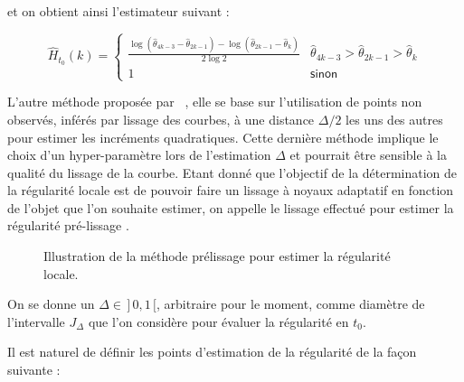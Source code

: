 et on obtient ainsi l'estimateur suivant :

$$\hat H_{t_0}(k) = \begin{cases} \displaystyle\frac{\log\left( \hat \theta_{4k-3} - \hat \theta_{2k-1}  \right) - \log \left(  \hat\theta_{2k-1} - \hat \theta_k \right)}{2\log 2} & \hat \theta_{4k-3} > \hat \theta_{2k-1} > \hat \theta_{k}
    \\
    1 & \textsf{sinon}
\end{cases}$$


L'autre méthode proposée par ~\cite{golovkine2021adaptive,maissoro-SmoothnessFTSweakDep}, elle se base sur l'utilisation de points non observés, inférés par lissage des courbes, à une distance $\Delta / 2$ les uns des autres pour estimer les incréments quadratiques. Cette dernière méthode implique le choix d'un hyper-paramètre lors de l'estimation $\Delta$ et pourrait être sensible à la qualité du lissage de la courbe. Etant donné que l'objectif de la détermination de la régularité locale est de pouvoir faire un lissage à noyaux adaptatif en fonction de l'objet que l'on souhaite estimer, on appelle le lissage effectué pour estimer la régularité \og pré-lissage \fg.

\begin{figure}[H]
    \centering
    \begin{minipage}{0.45\linewidth}
        
    \end{minipage}
    \hfill
    \begin{minipage}{0.45\linewidth}
        
    \end{minipage}
    \caption{Illustration de la méthode \og prélissage \fg pour estimer la régularité locale.}
    \label{fig:delta_method_example}
\end{figure}
\smallskip

On se donne un $\Delta \in \, ] \, 0,1 \,[$, arbitraire pour le moment, comme diamètre de l'intervalle $J_\Delta$ que l'on considère pour évaluer la régularité en $t_0$.

Il est naturel de définir les points d'estimation de la régularité de la façon suivante :

